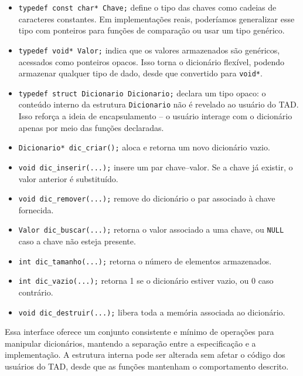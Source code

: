 \begin{itemize}
\item \verb|typedef const char* Chave;| define o tipo das chaves como cadeias de caracteres constantes. 
Em implementações reais, poderíamos generalizar esse tipo com ponteiros para funções de comparação ou usar um tipo genérico.

\item \verb|typedef void* Valor;| indica que os valores armazenados são genéricos, acessados como ponteiros opacos. 
Isso torna o dicionário flexível, podendo armazenar qualquer tipo de dado, desde que convertido para \texttt{void*}.

\item \verb|typedef struct Dicionario Dicionario;| declara um tipo opaco: o conteúdo interno da estrutura \texttt{Dicionario} não é revelado ao usuário do TAD. 
Isso reforça a ideia de encapsulamento -- o usuário interage com o dicionário apenas por meio das funções declaradas.

\item \verb|Dicionario* dic_criar();| aloca e retorna um novo dicionário vazio.

\item \verb|void dic_inserir(...);| insere um par chave–valor. Se a chave já existir, o valor anterior é substituído.

\item \verb|void dic_remover(...);| remove do dicionário o par associado à chave fornecida.

\item \verb|Valor dic_buscar(...);| retorna o valor associado a uma chave, ou \texttt{NULL} caso a chave não esteja presente.

\item \verb|int dic_tamanho(...);| retorna o número de elementos armazenados.

\item \verb|int dic_vazio(...);| retorna 1 se o dicionário estiver vazio, ou 0 caso contrário.

\item \verb|void dic_destruir(...);| libera toda a memória associada ao dicionário.
\end{itemize}

Essa interface oferece um conjunto consistente e mínimo de operações para manipular dicionários, mantendo a separação entre a especificação e a implementação. 
A estrutura interna pode ser alterada sem afetar o código dos usuários do TAD, desde que as funções mantenham o comportamento descrito.

